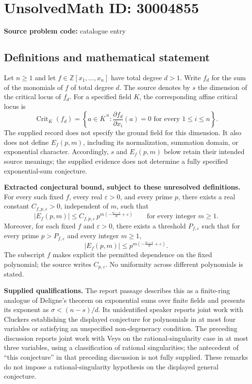 \documentclass[11pt]{article}
\newcommand{\Z}{\mathbb{Z}}
\begin{document}
\section*{UnsolvedMath ID: 30004855}
\textbf{Source problem code:} catalogue entry
\subsection{Definitions and mathematical statement}
Let \(n\geq 1\) and let \(f\in\Z[x_1,\ldots,x_n]\) have total degree \(d>1\). Write \(f_d\) for the sum of the monomials of \(f\) of total degree \(d\). The source denotes by \(s\) the dimension of the critical locus of \(f_d\). For a specified field \(K\), the corresponding affine critical locus is
\[
\operatorname{Crit}_K(f_d)=\left\{a\in\overline K^{\,n}:\frac{\partial f_d}{\partial x_i}(a)=0\text{ for every }1\leq i\leq n\right\}.
\]
The supplied record does not specify the ground field for this dimension. It also does not define \(E_f(p,m)\), including its normalization, summation domain, or exponential character. Accordingly, \(s\) and \(E_f(p,m)\) below retain their intended source meanings; the supplied evidence does not determine a fully specified exponential-sum conjecture.

\textbf{Extracted conjectural bound, subject to these unresolved definitions.} For every such fixed \(f\), every real \(\varepsilon>0\), and every prime \(p\), there exists a real constant \(C_{f,p,\varepsilon}>0\), independent of \(m\), such that
\[
\lvert E_f(p,m)\rvert\leq C_{f,p,\varepsilon}\,p^{m\left(-\frac{n-s}{d}+\varepsilon\right)}
\qquad\text{for every integer }m\geq 1.
\]
Moreover, for each fixed \(f\) and \(\varepsilon>0\), there exists a threshold \(P_{f,\varepsilon}\) such that for every prime \(p>P_{f,\varepsilon}\) and every integer \(m\geq1\),
\[
\lvert E_f(p,m)\rvert\leq p^{m\left(-\frac{n-s}{d}+\varepsilon\right)}.
\]
The subscript \(f\) makes explicit the permitted dependence on the fixed polynomial; the source writes \(C_{p,\varepsilon}\). No uniformity across different polynomials is stated.

\textbf{Supplied qualifications.} The report passage describes this as a finite-ring analogue of Deligne's theorem on exponential sums over finite fields and presents its exponent as \(\sigma<(n-s)/d\). Its unidentified speaker reports joint work with Cluckers establishing the displayed conjecture for polynomials in at most four variables or satisfying an unspecified non-degeneracy condition. The preceding discussion reports joint work with Veys on the rational-singularity case in at most three variables, using a classification of rational singularities; the antecedent of ``this conjecture'' in that preceding discussion is not fully supplied. These remarks do not impose a rational-singularity hypothesis on the displayed general conjecture.
\end{document}
